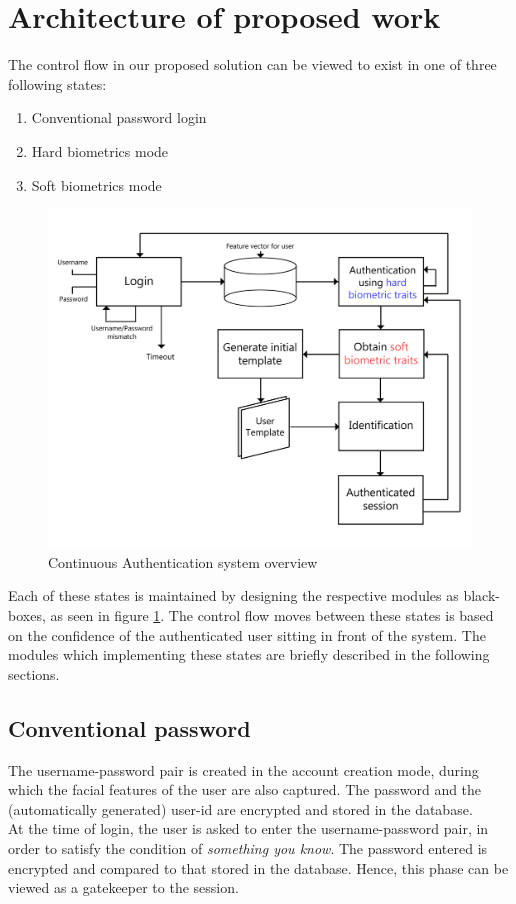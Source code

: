 \documentclass[%
        final,
        internal,
        notitlepage,
        narroweqnarray,
        inline,
        ]{ieee}
\begin{document}
\section{Architecture of proposed work} \label{sec:arch}
The control flow in our proposed solution can be viewed to exist in one of three following states:
\begin{enumerate}
	\item Conventional password login
	\item Hard biometrics mode
	\item Soft biometrics mode
\end{enumerate}
\begin{figure}[h!]
	\centering
	\includegraphics[scale=0.5]{img/overall_f.png}
	\caption{Continuous Authentication system overview}
	\label{fig:ca_overview}
\end{figure}
Each of these states is maintained by designing the respective modules as black-boxes, as seen in figure \ref{fig:ca_overview}.
The control flow moves between these states is based on the confidence of the authenticated user sitting in front of the system.
The modules which implementing these states are briefly described in the following sections.

\subsection{Conventional password}
The username-password pair is created in the account creation mode, during which the facial features of the user are also captured.
The password and the (automatically generated) user-id are encrypted and stored in the database.\\
At the time of login, the user is asked to enter the username-password pair, in order to satisfy the condition of \emph{something you know}.
The password entered is encrypted and compared to that stored in the database.
Hence, this phase can be viewed as a gatekeeper to the session. 
\end{document}
